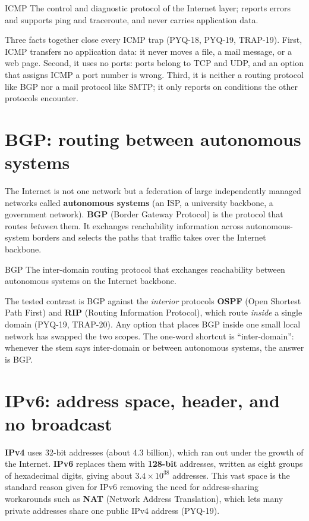\begin{definitionbox}{ICMP}
The control and diagnostic protocol of the Internet layer; reports errors and
supports ping and traceroute, and never carries application data.
\end{definitionbox}

Three facts together close every ICMP trap (PYQ-18, PYQ-19, TRAP-19). First,
ICMP transfers no application data: it never moves a file, a mail message,
or a web page. Second, it uses no ports: ports belong to TCP and UDP, and an
option that assigns ICMP a port number is wrong. Third, it is neither a
routing protocol like BGP nor a mail protocol like SMTP; it only reports on
conditions the other protocols encounter.

\section{BGP: routing between autonomous systems}
The Internet is not one network but a federation of large independently
managed networks called \textbf{autonomous systems} (an ISP, a university
backbone, a government network). \textbf{BGP} (Border Gateway Protocol) is
the protocol that routes \emph{between} them. It exchanges reachability
information across autonomous-system borders and selects the paths that
traffic takes over the Internet backbone.

\begin{definitionbox}{BGP}
The inter-domain routing protocol that exchanges reachability between
autonomous systems on the Internet backbone.
\end{definitionbox}

The tested contrast is BGP against the \emph{interior} protocols
\textbf{OSPF} (Open Shortest Path First) and \textbf{RIP} (Routing
Information Protocol), which route \emph{inside} a single domain (PYQ-19,
TRAP-20). Any option that places BGP inside one small local network has
swapped the two scopes. The one-word shortcut is ``inter-domain'': whenever
the stem says inter-domain or between autonomous systems, the answer is BGP.

\section{IPv6: address space, header, and no broadcast}
\textbf{IPv4} uses 32-bit addresses (about 4.3 billion), which ran out under
the growth of the Internet. \textbf{IPv6} replaces them with \textbf{128-bit}
addresses, written as eight groups of hexadecimal digits, giving about
$3.4 \times 10^{38}$ addresses. This vast space is the standard reason given
for IPv6 removing the need for address-sharing workarounds such as
\textbf{NAT} (Network Address Translation), which lets many private addresses
share one public IPv4 address (PYQ-19).

